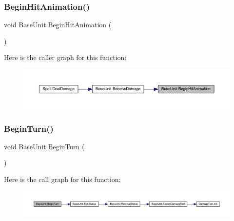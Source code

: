 \subsubsection{\texorpdfstring{BeginHitAnimation()}{BeginHitAnimation()}}
{\footnotesize\ttfamily void Base\+Unit.\+Begin\+Hit\+Animation (\begin{DoxyParamCaption}{ }\end{DoxyParamCaption})}

Here is the caller graph for this function\+:\nopagebreak
\begin{figure}[H]
\begin{center}
\leavevmode
\includegraphics[width=350pt]{class_base_unit_a01c63c5cd0d41b5ca787470fd0c19472_icgraph}
\end{center}
\end{figure}
\mbox{\label{class_base_unit_a0f8955c72dfa02027c1b247d74233f0d}} 
\subsubsection{\texorpdfstring{BeginTurn()}{BeginTurn()}}
{\footnotesize\ttfamily void Base\+Unit.\+Begin\+Turn (\begin{DoxyParamCaption}{ }\end{DoxyParamCaption})}

Here is the call graph for this function\+:\nopagebreak
\begin{figure}[H]
\begin{center}
\leavevmode
\includegraphics[width=350pt]{class_base_unit_a0f8955c72dfa02027c1b247d74233f0d_cgraph}
\end{center}
\end{figure}
\mbox{\label{class_base_unit_a5fb838313b1a61dbf38d440c2a12667e}} 
